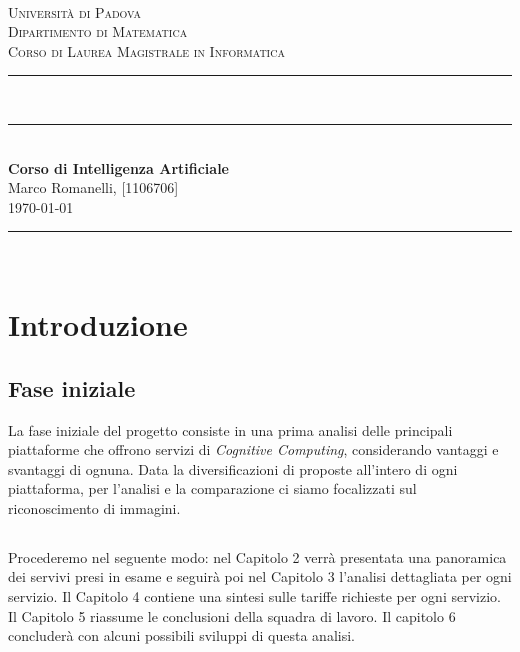 \documentclass[fleqn,a4paper,11pt]{report}
\newcommand\HRule{\rule{\textwidth}{1pt}}
\newcommand\DRule{\rule{\textwidth}{.4pt}\\[\dimexpr-\baselineskip+1mm+2pt] \rule{\textwidth}{2pt}}
\begin{document}
\begin{titlepage}
\begin{center}
	\begin{minipage}{6in}
  		\centering
  		\hspace*{1.6in}
	\end{minipage}\\[.5cm]
\textsc{\LARGE Universit\`a di Padova}\\[.2cm]
\textsc{\large Dipartimento di Matematica\\
			Corso di Laurea Magistrale in Informatica}\\[.3cm]
\DRule \\[.5cm]
{ \huge \bfseries Corso di Intelligenza Artificiale}\\[.4cm]
{\Large Marco Romanelli, [1106706]} \\[1cm]
{\large \today}
\HRule \\[3cm]
\end{center}
\end{titlepage}
\newpage

\chapter{Introduzione}
\section{Fase iniziale}
La fase iniziale del progetto consiste in una prima analisi delle principali piattaforme che offrono servizi di \textit{Cognitive Computing}, considerando vantaggi e svantaggi di ognuna.
Data la diversificazioni di proposte all'intero di ogni piattaforma, per l'analisi e la comparazione ci siamo focalizzati sul riconoscimento di immagini.


\section*{}
Procederemo nel seguente modo: nel Capitolo 2 verrà presentata una panoramica dei servivi presi in esame e seguirà poi nel Capitolo 3 l'analisi dettagliata per ogni servizio.
Il Capitolo 4 contiene una sintesi sulle tariffe richieste per ogni servizio.
Il Capitolo 5 riassume le conclusioni della squadra di lavoro. 
Il capitolo 6 concluderà con alcuni possibili sviluppi di questa analisi.
\end{document}
